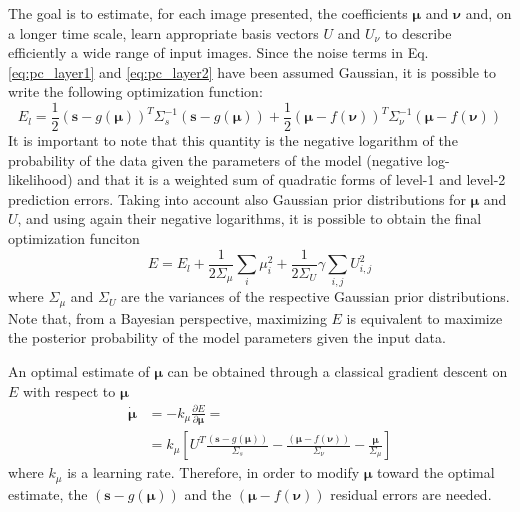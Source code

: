 \documentclass[10pt]{article}
\begin{document}
The goal is to estimate, for each image presented, the coefficients $\bm{\mu}$ and $\bm{\nu}$ and, on a longer time scale, learn appropriate basis vectors $U$ and $U_{\nu}$ to describe efficiently a wide range of input images. 
Since the noise terms in Eq. \ref{eq:pc_layer1} and \ref{eq:pc_layer2} have been assumed Gaussian, it is possible to write the following optimization function:
\begin{equation}
    E_l = \frac{1}{2} (\bm{s} - g(\bm{\mu}))^T \Sigma_{s}^{-1} (\bm{s} - g(\bm{\mu})) + \frac{1}{2} (\bm{\mu} - f(\bm{\nu}))^T \Sigma_{\nu}^{-1} (\bm{\mu} - f(\bm{\nu}))
\end{equation}
It is important to note that this quantity is the negative logarithm of the probability of the data given the parameters of the model (negative log-likelihood) and that it is a weighted sum of quadratic forms of level-1 and level-2 prediction errors.
Taking into account also Gaussian prior distributions for $\bm{\mu}$ and $U$, and using again their negative logarithms, it is possible to obtain the final optimization funciton
\begin{equation}
    E = E_l + \frac{1}{2 \Sigma_{\mu}} \sum_i \mu_i ^2 + \frac{1}{2 \Sigma_{U}} \gamma \sum_{i,j} U_{i,j}^2
    \label{eq:pc_E_with_priors}
\end{equation}
where $\Sigma_{\mu}$ and $\Sigma_{U}$ are the variances of the respective Gaussian prior distributions. 
Note that, from a Bayesian perspective, maximizing $E$ is equivalent to maximize the posterior probability of the model parameters given the input data.

An optimal estimate of $\bm{\mu}$ can be obtained through a classical gradient descent on $E$ with respect to $\bm{\mu}$
\begin{equation}
    \begin{split}
        \dot{\bm{\mu}} &=  -k_{\mu}\frac{\partial E}{\partial \bm{\mu}} = \\
                             &= k_{\mu} \left[ U^{T}\frac{(\bm{s} - g(\bm{\mu}) )}{\Sigma_s} - \frac{(\bm{\mu} - f(\bm{\nu}))}{\Sigma_{\nu}} - \frac{\bm{\mu}}{\Sigma_{\mu}} \right]
    \end{split}
    \label{eq:learning_mu}
\end{equation}
where $k_\mu$ is a learning rate.
Therefore, in order to modify $\bm{\mu}$ toward the optimal estimate, the $(\bm{s} - g(\bm{\mu}))$ and the $(\bm{\mu} - f(\bm{\nu}))$ residual errors are needed.
\begin{comment}
\begin{figure}[!h]
	\centering
	\texttt{[image: message\_passing.png]}
	\caption{General architecture of the hierarchical predictive coding model. At each hierarchical level, feedback pathways carry predictions of neural activity at the lower level, whereas feedforward pathways carry residual errors between the predictions and actual neural activity. These errors are used by the predictive estimator at each level to correct its current estimate of the input signal and generate the next prediction. Figure taken and adapted from \citep{Rao1999}}
	\label{fig:mess_pass}
\end{figure}
\end{comment}
\end{document}
